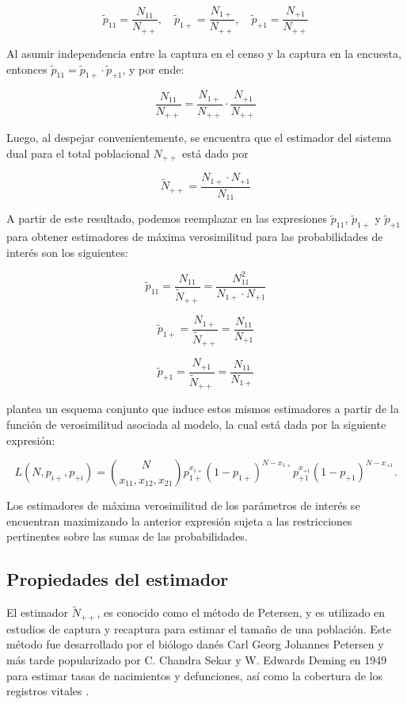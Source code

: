 \documentclass[
  12pt,
]{book}
\begin{document}
\[
\tilde{p}_{11} = \frac{N_{11}}{N_{++}},  \quad 
\tilde{p}_{1+} = \frac{N_{1+}}{N_{++}},  \quad 
\tilde{p}_{+1} = \frac{N_{+1}}{N_{++}}
\]

Al asumir independencia entre la captura en el censo y la captura en la encuesta, entonces \(\tilde{p}_{11} = \tilde{p}_{1+} \cdot \tilde{p}_{+1}\), y por ende:

\[
\frac{N_{11}}{N_{++}} = \frac{N_{1+}}{N_{++}} \cdot \frac{N_{+1}}{N_{++}}
\]

Luego, al despejar convenientemente, se encuentra que el estimador del sistema dual para el total poblacional \(N_{++}\) está dado por

\[
\tilde{N}_{++} = \frac{N_{1+} \cdot N_{+1}}{N_{11}} 
\]

A partir de este resultado, podemos reemplazar en las expresiones \(\tilde{p}_{11}\), \(\tilde{p}_{1+}\) y \(\tilde{p}_{+1}\) para obtener estimadores de máxima verosimilitud para las probabilidades de interés son los siguientes:

\[
\tilde{p}_{11} = \frac{N_{11}}{\tilde{N}_{++}} = \frac{N_{11}^2}{N_{1+} \cdot N_{+1}}
\]

\[
\tilde{p}_{1+} = \frac{N_{1+}}{\tilde{N}_{++}} = \frac{N_{11}}{N_{+1}}
\]

\[
\tilde{p}_{+1} = \frac{N_{+1}}{\tilde{N}_{++}} = \frac{N_{11}}{N_{1+}}
\]

\citet[sección 2.4]{wolter1986coverage} plantea un esquema conjunto que induce estos mismos estimadores a partir de la función de verosimilitud asociada al modelo, la cual está dada por la siguiente expresión:

\[
L(N, p_{i+}, p_{+i}) = \binom{N}{x_{11}, x_{12}, x_{21}} p_{1+}^{x_{1+}} (1 - p_{1+})^{N - x_{1+}} p_{+1}^{x_{+1}} (1 - p_{+1})^{N - x_{+1}}.
\]

Los estimadores de máxima verosimilitud de los parámetros de interés se encuentran maximizando la anterior expresión sujeta a las restricciones pertinentes sobre las sumas de las probabilidades.

\subsection{Propiedades del estimador}\label{propiedades-del-estimador}

El estimador \(\tilde{N}_{++}\), es conocido como el método de Petersen, y es utilizado en estudios de captura y recaptura para estimar el tamaño de una población. Este método fue desarrollado por el biólogo danés Carl Georg Johannes Petersen \citep{petersen1896} y más tarde popularizado por C. Chandra Sekar y W. Edwards Deming en 1949 para estimar tasas de nacimientos y defunciones, así como la cobertura de los registros vitales \citep{sekar1949}.
\end{document}
